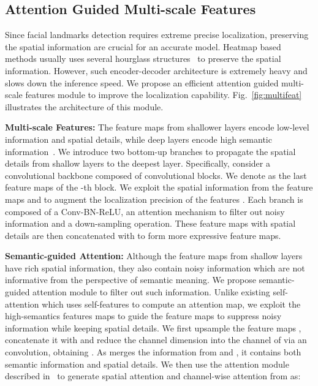 \documentclass[runningheads]{llncs}
\begin{document}
\subsection{Attention Guided Multi-scale Features}
Since facial landmarks detection requires extreme precise localization, preserving the spatial information are crucial for an accurate model.
Heatmap based methods usually uses several hourglass structures~\cite{HG} to preserve the spatial information. 
However, such encoder-decoder architecture is extremely heavy and slows down the inference speed.
We propose an efficient attention guided multi-scale features module to improve the localization capability.
Fig.~\ref{fig:multifeat} illustrates the architecture of this module.


\textbf{Multi-scale Features:}
The feature maps from shallower layers encode low-level information and spatial details, while deep layers encode high semantic information~\cite{MSCNN,FPN,Linchunze}.
We introduce two bottom-up branches to propagate the spatial details from shallow layers to the deepest layer.
Specifically, consider a convolutional backbone composed of  convolutional blocks. 
We denote  as the last feature maps of the -th block.
We exploit the spatial information from the feature maps  and  to augment the localization precision of the features .
Each branch is composed of a  Conv-BN-ReLU, an attention mechanism to filter out noisy information and a down-sampling operation. 
These feature maps with spatial details are then concatenated with  to form more expressive feature maps.



\textbf{Semantic-guided Attention:}
Although the feature maps from shallow layers have rich spatial information, they also contain noisy information which are not informative from the perspective of semantic meaning.
We propose semantic-guided attention module to filter out such information.
Unlike existing self-attention which uses self-features to compute an attention map, we exploit the high-semantics features maps  to guide the feature maps  to suppress noisy information while keeping spatial details.
We first upsample the feature maps , concatenate it with  and reduce the channel dimension into the channel of  via an  convolution, obtaining .
As  merges the information from  and , it contains both semantic information and spatial details.
We then use the attention module described in~\cite{cbam} to generate spatial attention  and channel-wise attention  from  as:
\end{document}
